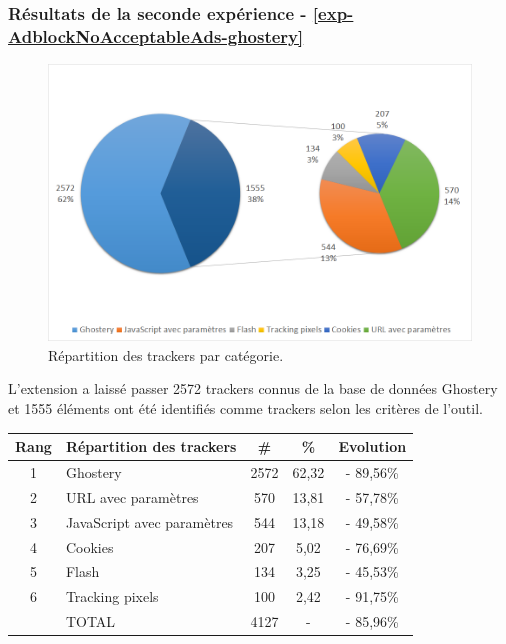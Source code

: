 
\subsubsection{Résultats de la seconde expérience - \autoref{exp-AdblockNoAcceptableAds-ghostery}}
\begin{figure}[!h]
	\centering
	\includegraphics[scale=.6]{resultats/ANALYSES/Images/AdblockNoAcceptableAds-Ghostery.png}
	\caption{\label{exp-AdblockNoAcceptableAds-ghostery}Répartition des trackers par catégorie.}
\end{figure}

L'extension a laissé passer 2572 trackers connus de la base de données Ghostery et 1555 éléments ont été identifiés comme trackers selon les critères de l'outil.\\

\begin{tabular}{ c | p{5cm} | c | c || c | }
   Rang & Répartition des trackers & \# & \% & Evolution \\
   \hline
   \hline
   1 & Ghostery & 2572 & 62,32 & - 89,56\% \\
   2 & URL avec paramètres & 570 & 13,81 & - 57,78\% \\
   3 & JavaScript avec paramètres & 544 & 13,18 & - 49,58\% \\
   4 & Cookies & 207 & 5,02 & - 76,69\% \\
   5 & Flash & 134 & 3,25 & - 45,53\% \\
   6 & Tracking pixels & 100 & 2,42 & - 91,75\% \\
   \hline
    & TOTAL & 4127 & - & - 85,96\%\\
   \hline
\end{tabular}
\\[1cm]

